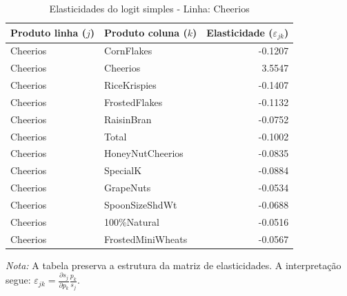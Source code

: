 \begingroup
\begin{table}[H]
\centering
\caption{Elasticidades do logit simples - Linha: Cheerios}
\label{tab:elas-cheerios}
\small
\begin{tabular}{llr}
\toprule
Produto linha ($j$) & Produto coluna ($k$) & Elasticidade ($\varepsilon_{jk}$) \\
\midrule
Cheerios & CornFlakes & -0.1207 \\
Cheerios & Cheerios & 3.5547 \\
Cheerios & RiceKrispies & -0.1407 \\
Cheerios & FrostedFlakes & -0.1132 \\
Cheerios & RaisinBran & -0.0752 \\
Cheerios & Total & -0.1002 \\
Cheerios & HoneyNutCheerios & -0.0835 \\
Cheerios & SpecialK & -0.0884 \\
Cheerios & GrapeNuts & -0.0534 \\
Cheerios & SpoonSizeShdWt & -0.0688 \\
Cheerios & 100\%Natural & -0.0516 \\
Cheerios & FrostedMiniWheats & -0.0567 \\
\bottomrule
\end{tabular}

\vspace{0.3em}
\footnotesize
\textit{Nota:} A tabela preserva a estrutura da matriz de elasticidades. A interpretação segue: $\varepsilon_{jk}=\frac{\partial s_j}{\partial p_k}\frac{p_k}{s_j}$.
\end{table}
\endgroup


